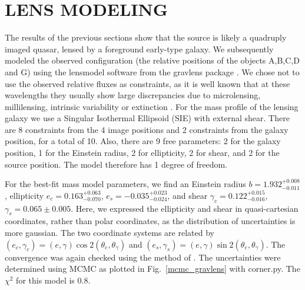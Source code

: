 \documentclass[manuscript]{aastex}
\begin{document}

\section{LENS MODELING}

The results of the previous sections show that the source is likely a quadruply imaged quasar, lensed by a foreground early-type galaxy. We subsequently modeled the observed configuration (the relative positions of the objects A,B,C,D and G) using the lensmodel software from the gravlens package \citep{kee01}. We chose not to use the observed relative fluxes as constraints, as it is well known that at these wavelengths they usually show large discrepancies due to microlensing, millilensing, intrinsic variability or extinction \citep[e.g.,][]{slu08}. For the mass profile of the lensing galaxy we use a Singular Isothermal Ellipsoid (SIE) with external shear. There are 8 constraints from the 4 image positions and 2 constraints from the galaxy position, for a total of 10. Also, there are 9 free parameters: 2 for the galaxy position, 1 for the Einstein radius, 2 for ellipticity, 2 for shear, and 2 for the source position. The model therefore has 1 degree of freedom.

For the best-fit mass model parameters, we find an Einstein radius $b = 1.932_{-0.011}^{+0.008}$, ellipticity $e_c = 0.163_{-0.070}^{+0.063}$, $e_s = -0.035_{-0.024}^{+0.023}$, and shear $\gamma_c = 0.122_{-0.016}^{+0.015}$, $\gamma_s = 0.065\pm0.005$. Here, we expressed the ellipticity and shear in quasi-cartesian coordinates, rather than polar coordinates, as the distribution of uncertainties is more gaussian. The two coordinate systems are related by $(e_c,\gamma_c) = (e,\gamma)\cos2(\theta_e,\theta_\gamma)$ and $(e_s,\gamma_s) = (e,\gamma)\sin2(\theta_e,\theta_\gamma)$. The convergence was again checked using the method of \citet{gel95}. The uncertainties were determined using MCMC as plotted in Fig.~\ref{mcmc_gravlens} with corner.py. The $\chi^2$ for this model is 0.8. 
\end{document}
